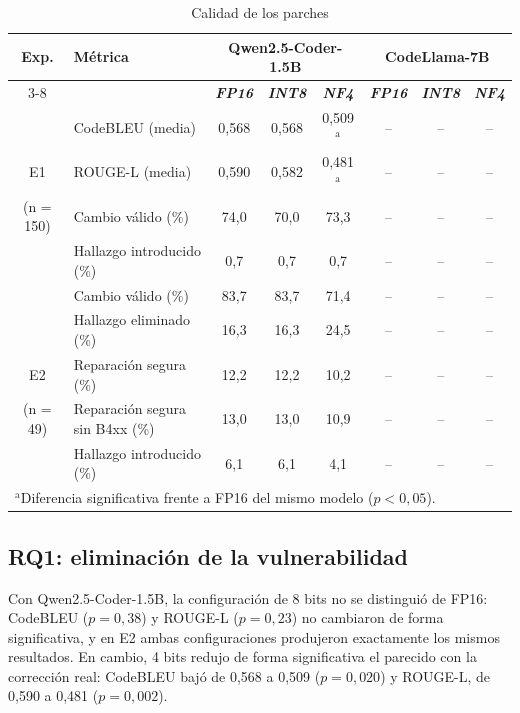 \documentclass[conference]{IEEEtran}
\begin{document}
\begin{table}[htbp]
\caption{Calidad de los parches}
\begin{center}
\begin{tabular}{|c|l|c|c|c|c|c|c|}
\hline
\textbf{Exp.} & \textbf{Métrica} & \multicolumn{3}{|c|}{\textbf{Qwen2.5-Coder-1.5B}} & \multicolumn{3}{|c|}{\textbf{CodeLlama-7B}} \\
\cline{3-8}
 & & \textbf{\textit{FP16}} & \textbf{\textit{INT8}} & \textbf{\textit{NF4}} & \textbf{\textit{FP16}} & \textbf{\textit{INT8}} & \textbf{\textit{NF4}} \\
\hline
 & CodeBLEU (media) & 0,568 & 0,568 & 0,509$^{\mathrm{a}}$ & -- & -- & -- \\
E1 & ROUGE-L (media) & 0,590 & 0,582 & 0,481$^{\mathrm{a}}$ & -- & -- & -- \\
(n = 150) & Cambio válido (\%) & 74,0 & 70,0 & 73,3 & -- & -- & -- \\
 & Hallazgo introducido (\%) & 0,7 & 0,7 & 0,7 & -- & -- & -- \\
\hline
 & Cambio válido (\%) & 83,7 & 83,7 & 71,4 & -- & -- & -- \\
 & Hallazgo eliminado (\%) & 16,3 & 16,3 & 24,5 & -- & -- & -- \\
E2 & Reparación segura (\%) & 12,2 & 12,2 & 10,2 & -- & -- & -- \\
(n = 49) & Reparación segura sin B4xx (\%) & 13,0 & 13,0 & 10,9 & -- & -- & -- \\
 & Hallazgo introducido (\%) & 6,1 & 6,1 & 4,1 & -- & -- & -- \\
\hline
\multicolumn{8}{l}{$^{\mathrm{a}}$Diferencia significativa frente a FP16 del mismo modelo ($p < 0{,}05$).}
\end{tabular}
\label{tab:calidad}
\end{center}
\end{table}

\subsection{RQ1: eliminación de la vulnerabilidad}

Con Qwen2.5-Coder-1.5B, la configuración de 8 bits no se distinguió de FP16: CodeBLEU ($p = 0{,}38$) y ROUGE-L ($p = 0{,}23$) no cambiaron de forma significativa, y en E2 ambas configuraciones produjeron exactamente los mismos resultados. En cambio, 4 bits redujo de forma significativa el parecido con la corrección real: CodeBLEU bajó de 0,568 a 0,509 ($p = 0{,}020$) y ROUGE-L, de 0,590 a 0,481 ($p = 0{,}002$).
\end{document}
